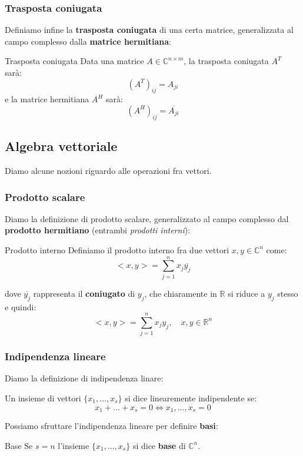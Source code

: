 \documentclass[a4paper,11pt]{article}
\begin{document}
\subsubsection{Trasposta coniugata}
Definiamo infine la \textbf{trasposta coniugata} di una certa matrice, generalizzata al campo complesso dalla \textbf{matrice hermitiana}:
\begin{definition}{Trasposta coniugata}
	Data una matrice $A \in \mathbb{C}^{n \times m}$, la trasposta coniugata $A^T$ sarà:
	$$
		(A^T)_{ij} = A_{ji}
	$$
	e la matrice hermitiana $A^H$ sarà: 
	$$
		(A^H)_{ij} = \overline{A_{ji}}
	$$
\end{definition}

\subsection{Algebra vettoriale}
Diamo alcune nozioni riguardo alle operazioni fra vettori.

\subsubsection{Prodotto scalare}
Diamo la definizione di prodotto scalare, generalizzato al campo complesso dal \textbf{prodotto hermitiano} (entrambi \textit{prodotti interni}):
\begin{definition}{Prodotto interno}
	Definiamo il prodotto interno fra due vettori $x, y \in \mathbb{C}^n$ come:
	$$
	<x, y> = \sum_{j = 1}^n x_j \overline{y_j}
	$$
\end{definition}
dove $\overline{y_j}$ rappresenta il \textbf{coniugato} di $y_j$, che chiaramente in $\mathbb{R}$ si riduce a $y_j$ stesso e quindi:
	$$
	<x, y> = \sum_{j = 1}^n x_j y_j, \quad x, y \in \mathbb{R}^n
	$$ 


\subsubsection{Indipendenza lineare}
Diamo la definizione di indipendenza linare:
\begin{definition}{}
	Un insieme di vettori $\{x_1, ..., x_s\}$ si dice linearemente indipendente se:
	$$
		x_1 + ... + x_s = 0 \Leftrightarrow x_1, ..., x_s = 0
	$$
\end{definition}

Possiamo sfruttare l'indipendenza lineare per definire \textbf{basi}:
\begin{definition}{Base}
	Se $s = n$ l'insieme $\{ x_1, ...,x_s \}$ si dice \textbf{base} di $\mathbb{C}^n$.
\end{definition}
\end{document}
